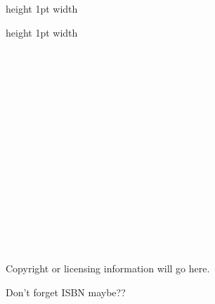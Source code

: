 \maketitle

\newpage
~
\newpage

~\\~\\~\\~\\~\\~\\~\\~\\~\\

\begin{center}
	\begin{Large}
		\noindent\vrule height 1pt width \textwidth
		
		\textbf{\thetitle}
		
		\noindent\vrule height 1pt width \textwidth
	\end{Large}
	
	\theauthor
\end{center}

\newpage

~\\~\\~\\~\\~\\~\\~\\~\\~\\

\begin{large}
	\textbf{\thetitle}
\end{large}

~\\~\\~\\~\\~\\

\begin{small}
	Copyright or licensing information will go here.
	
	Don't forget ISBN maybe??
\end{small}



\newpage

